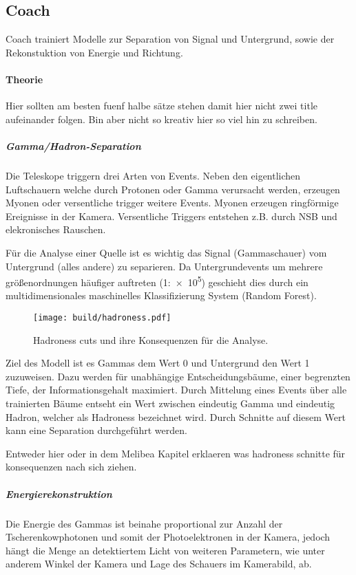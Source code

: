 \subsection{Coach}%
\label{sub:coach}
Coach trainiert Modelle zur Separation von Signal und Untergrund, 
sowie der Rekonstuktion von Energie und Richtung.
\paragraph{Theorie}%
{\color{red}Hier sollten am besten fuenf halbe sätze stehen damit hier nicht zwei title aufeinander
folgen. Bin aber nicht so kreativ hier so viel hin zu schreiben.}

\subparagraph{Gamma/Hadron-Separation}
Die Teleskope triggern drei Arten von Events. 
Neben den eigentlichen Luftschauern welche durch Protonen 
oder Gamma verursacht werden,
erzeugen Myonen oder versentliche trigger weitere Events.
Myonen erzeugen ringförmige Ereignisse in der Kamera.
Versentliche Triggers entstehen z.B. durch NSB und elekronisches Rauschen.

Für die Analyse einer Quelle ist es wichtig das Signal (Gammaschauer) vom 
Untergrund (alles andere) zu separieren.
Da Untergrundevents um mehrere größenordnungen häufiger auftreten (1:\num{e5})
geschieht dies durch ein multidimensionales maschinelles Klassifizierung 
System (Random Forest).

\begin{wrapfigure}[18]{L}{0.6\textwidth}
  \centering
  \texttt{[image: build/hadroness.pdf]}
  \caption{Hadroness cuts und ihre Konsequenzen für die Analyse.}%
  \label{fig:uebersicht}
\end{wrapfigure}
Ziel des Modell ist es Gammas dem Wert 0 und Untergrund den Wert 1 zuzuweisen.
Dazu werden für unabhängige Entscheidungsbäume, 
einer begrenzten Tiefe, 
der Informationsgehalt maximiert.
Durch Mittelung eines Events über alle trainierten Bäume entseht ein Wert
zwischen eindeutig Gamma und eindeutig Hadron, welcher als Hadroness bezeichnet
wird.
Durch Schnitte auf diesem Wert kann eine Separation durchgeführt werden.

Entweder hier oder in dem Melibea Kapitel erklaeren was hadroness schnitte für
konsequenzen nach sich ziehen.

\subparagraph{Energierekonstruktion}%
\label{par:energie}

Die Energie des Gammas ist beinahe proportional
zur Anzahl der Tscherenkowphotonen
und somit der Photoelektronen in der Kamera,
jedoch hängt die Menge an detektiertem Licht von weiteren Parametern,
wie unter anderem Winkel der Kamera und Lage des Schauers im Kamerabild, ab.

